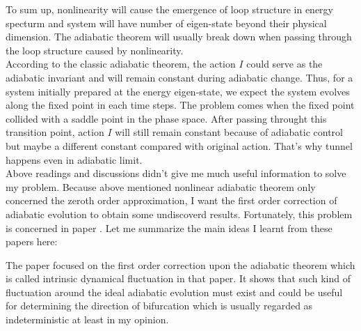 \documentclass[fontsize=11pt, %
                             paper=a4, %
                             twoside, %
                             captions=tableheading,
                             index=totoc,
                             hyperref]{labbook}
\begin{document}
\begin{addmargin}[4cm]{0cm}
To sum up, nonlinearity will cause the emergence of loop structure in energy specturm and system will have number of eigen-state beyond their physical dimension. The adiabatic theorem will usually break down when passing through the loop structure caused by nonlinearity. \\
According to the classic adiabatic theorem, the action $I$ could serve as the adiabatic invariant and will remain constant during adiabatic change. Thus, for a system initially prepared at the energy eigen-state, we expect the system evolves along the fixed point in each time steps. The problem comes when the fixed point collided with a saddle point in the phase space. After passing throught this transition point, action $I$ will still remain constant because of adiabatic control but maybe a different constant compared with original action. That's why tunnel happens even in adiabatic limit.\\

Above readings and discussions didn't give me much useful information to solve my problem. Because above mentioned nonlinear adiabatic theorem only concerned the zeroth order approximation, I want the first order correction of adiabatic evolution to obtain some undiscoverd results. Fortunately, this problem is concerned in paper \cite{PhysRevLett.110.130402, 1367-2630-16-12-123024, 1751-8121-45-29-295302, Zhang20121202}. Let me summarize the main ideas I learnt from these papers here:

The paper \cite{PhysRevLett.110.130402} focused on the first order correction upon the adiabatic theorem which is called intrinsic dynamical fluctuation in that paper. It shows that such kind of fluctuation around the ideal adiabatic evolution must exist and could be useful for determining the direction of bifurcation which is usually regarded as indeterministic at least in my opinion. \\


\end{addmargin}
\end{document}
